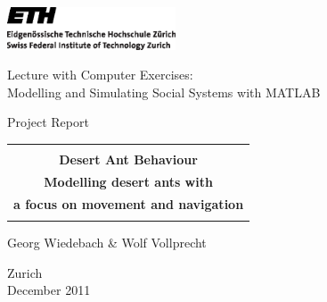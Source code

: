 
\thispagestyle{empty}

\begin{center}
\includegraphics[width=5cm]{images/ETHlogo.eps}

\bigskip


\bigskip


\bigskip


\LARGE{ Lecture with Computer Exercises:\\ }
\LARGE{ Modelling and Simulating Social Systems with MATLAB\\}

\bigskip

\bigskip

\small{Project Report}\\

\bigskip

\bigskip

\bigskip

\bigskip


\begin{tabular}{|c|}
\hline
\\
\textbf{\LARGE{ Desert Ant Behaviour }}\\
\textbf{\LARGE{ Modelling desert ants with }}\\
\textbf{\LARGE{ a focus on movement and navigation }}\\
\\
\hline
\end{tabular}
\bigskip

\bigskip

\bigskip

\LARGE{Georg Wiedebach \& Wolf Vollprecht}



\bigskip

\bigskip

\bigskip

\bigskip

\bigskip

\bigskip

\bigskip

\bigskip

Zurich\\
December 2011\\

\end{center}


